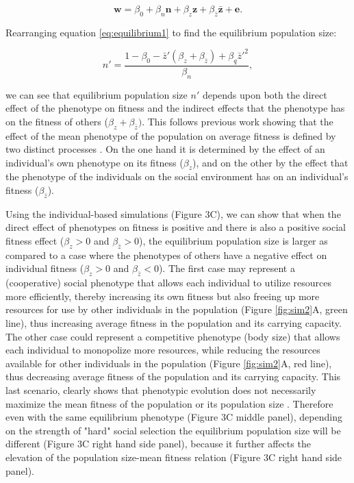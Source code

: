 \documentclass{article}
\begin{document}
\begin{equation} \label{eq: socialselection}
\mathbf{w}=\beta_{0} +\beta_{n} \mathbf{n} + \beta_{z} \mathbf{z}+ \beta_{\bar{z}} \bar{\mathbf{z}}+ \mathbf{e}.
\end{equation}
 
\noindent Rearranging equation \ref{eq:equilibrium1} to find the equilibrium population size:
 
\begin{equation}
n' = \frac{1-\beta_{0} - \bar{z}'(\beta_{z} + \beta_{\bar{z}} )+  \beta_{q} \bar{z}'^2}{\beta_{n}},
\end{equation}

\noindent we can see that equilibrium population size $n'$ depends upon both the direct effect of the phenotype on fitness and the indirect effects that the phenotype has on the fitness of others ($\beta_{z} + \beta_{\bar{z}})$. This follows previous work showing that the effect of the mean phenotype of the population on average fitness is defined by two distinct processes \citep{Engen2020, Lande2007, Abrams1993}. On the one hand it is determined by the effect of an individual's own phenotype on its fitness ($\beta_{z}$), and on the other by the effect that the phenotype of the individuals on the social environment has on an individual's fitness ($\beta_{\bar{z}}$).

Using the individual-based simulations (Figure 3C), we can show that when the direct effect of phenotypes on fitness is positive and there is also a positive social fitness effect ($\beta_{z}>0$ and $\beta_{\bar{z}}>0$), the equilibrium population size is larger as compared to a case where the phenotypes of others have a negative effect on individual fitness ($\beta_{z}>0$ and $\beta_{\bar{z}}<0$). The first case may represent a (cooperative) social phenotype that allows each individual to utilize resources more efficiently, thereby increasing its own fitness but also freeing up more resources for use by other individuals in the population (Figure \ref{fig:sim2}A, green line), thus increasing average fitness in the population and its carrying capacity. The other case could represent a competitive phenotype (body size) that allows each individual to monopolize more resources, while reducing the resources available for other individuals in the population (Figure \ref{fig:sim2}A, red line), thus decreasing average fitness of the population and its carrying capacity. This last scenario, clearly shows that phenotypic evolution does not necessarily maximize the mean fitness of the population or its population size \citep{Wright1969, Abrams1993}. Therefore even with the same equilibrium phenotype (Figure 3C middle panel), depending on the strength of "hard" social selection the equilibrium population size will be different (Figure 3C right hand side panel), because it further affects the elevation of the population size-mean fitness relation (Figure 3C right hand side panel).
\end{document}
